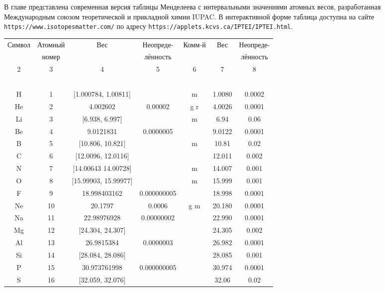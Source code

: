 \documentclass[a5paper,openany]{book}
\begin{document}
В главе представлена современная версия таблицы Менделеева с интервальными значениями атомных весов, разработанная Международным союзом теоретической и прикладной химии IUPAC.   
В интерактивной форме таблица доступна на сайте {\tt https://www.isotopesmatter.com/} по адресу {\tt https://applets.kcvs.ca/IPTEI/IPTEI.html}.


\begin{table}[h!]
	{\scriptsize 
		\begin{tabular}{ccccccc}
			Символ  & Атомный &  Вес  & Неопреде- & Комм-й &  Вес  & Неопреде-  \\
			~ & номер &  ~  & лённость &  ~  &  ~  & лённость  \\
			\hline 
			2 & 3 & 4 & 5  & 6 & 7 & 8\\
			\hline 
			~ & ~ & ~ & ~ & ~  & ~ & ~\\
			H & 1 & [1.000784, 1.00811] & ~ & m & 1.0080 & 0.0002\\ [1mm]
			He & 2 & 4.002602 & 0.00002 &  g r & 4.0026 & 0.0001 \\ [1mm]
			Li & 3 & [6.938, 6.997] & ~ & m  & 6.94 & 0.06 \\ [1mm]
			Be & 4 & 9.0121831 & 0.0000005 & ~  & 9.0122 & 0.0001 \\ [1mm]
			B & 5 & [10.806, 10.821] & ~ & m  & 10.81 & 0.02 \\ [1mm]
			C & 6 & [12.0096, 12.0116] & ~ & ~  & 12.011 & 0.002 \\ [1mm]
			N & 7 & [14.00643 14.00728] & ~ & m & 14.007 & 0.001 \\ [1mm]
			O & 8 & [15.99903, 15.99977] & ~ & m  & 15.999 & 0.001 \\ [1mm]
			F & 9 & 18.998403162 & 0.000000005 & ~  & 18.998 & 0.0001 \\ [1mm]
			Ne & 10 & 20.1797 & 0.0006 & g m  & 20.180 & 0.0001 \\ [1mm]
			Na & 11 & 22.98976928 & 0.00000002 & ~  & 22.990 & 0.0001 \\ [1mm]
			Mg & 12 & [24.304, 24.307] & ~ & ~  & 24.305 & 0.002 \\ [1mm]
			Al & 13 & 26.9815384 & 0.0000003 & ~  & 26.982 & 0.0001 \\ [1mm]
			Si & 14 & [28.084, 28.086] & ~ & ~  & 28.085 & 0.001 \\ [1mm]
			P & 15 & 30.973761998 & 0.000000005 & ~  & 30.974 & 0.0001 \\ [1mm]
			S & 16 & [32.059, 32.076] & ~ & ~  & 32.06 & 0.02 \\ [1mm]

\end{tabular}}
\end{table}
\end{document}
